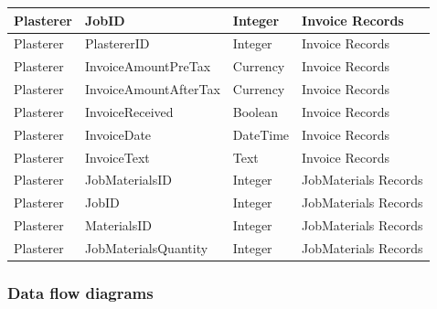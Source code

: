 \begin{flushleft}
\begin{longtable}{|p{3cm}|p{4cm}|p{3cm}|p{3cm}|}
Plasterer & JobID & Integer & Invoice Records \\ \hline
Plasterer & PlastererID & Integer & Invoice Records \\ \hline
Plasterer & InvoiceAmountPreTax & Currency & Invoice Records \\ \hline
Plasterer & InvoiceAmountAfterTax & Currency & Invoice Records \\ \hline
Plasterer & InvoiceReceived & Boolean & Invoice Records \\ \hline
Plasterer & InvoiceDate & DateTime & Invoice Records \\ \hline
Plasterer & InvoiceText & Text & Invoice Records \\ \hline
Plasterer & JobMaterialsID & Integer & JobMaterials Records \\ \hline
Plasterer & JobID & Integer & JobMaterials Records \\ \hline
Plasterer & MaterialsID & Integer & JobMaterials Records \\ \hline
Plasterer & JobMaterialsQuantity & Integer & JobMaterials Records \\ \hline


\end{longtable}
\end{flushleft}



\subsubsection{Data flow diagrams}


